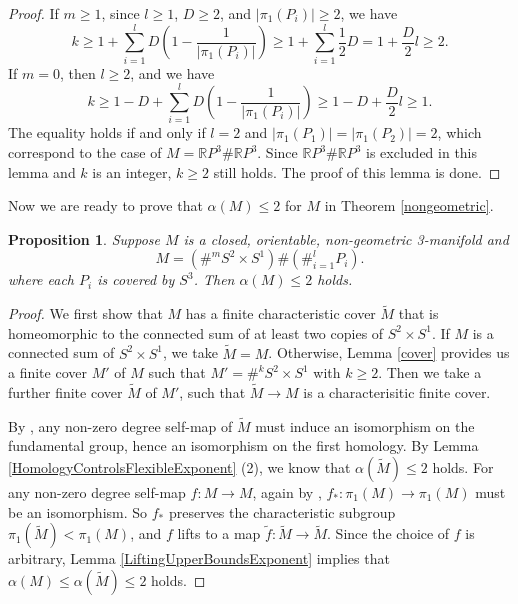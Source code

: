 \documentclass{amsart}
\newcommand{\ra}{\rightarrow}
\newtheorem{thm}{Theorem}[section]
\newtheorem{prop}[thm]{Proposition}
\begin{document}
\begin{proof}
If $m\geq 1$, since $l\geq 1$, $D\geq 2$, and $|\pi_1(P_i)|\geq 2$, we have 
$$k\geq 1+\sum_{i=1}^lD(1- \frac{1}{|\pi_1(P_i)|})\geq 1+\sum_{i=1}^l\frac{1}{2}D=1+\frac{D}{2}l\geq 2.$$ 
If $m=0$, then $l\geq 2$, and we have
$$k\geq 1-D+\sum_{i=1}^lD(1- \frac{1}{|\pi_1(P_i)|})\geq 1-D+\frac{D}{2}l\geq 1.$$
The equality holds if and only if $l=2$ and $|\pi_1(P_1)|=|\pi_1(P_2)|=2$, which correspond to the case of $M=\mathbb{R}P^3\# \mathbb{R}P^3$. Since $\mathbb{R}P^3\# \mathbb{R}P^3$ is excluded in this lemma and $k$ is an integer, $k\geq 2$ still holds. The proof of this lemma is done.

 \end{proof}


    
  
  Now we are ready to prove that $\alpha(M)\leq 2$ for $M$ in Theorem \ref{nongeometric}.
    
    \begin{prop}\label{upper bound}
    Suppose $M$ is a closed, orientable, non-geometric 3-manifold and  \[
        M=(\#^mS^2\times S^1)\#(\#_{i=1}^l P_i).
    \] where each $P_i$ is covered by $S^3$.
  Then $\alpha(M)\le 2$ holds.
    
    \end{prop}
\begin{proof} 
We first show that $M$ has a finite characteristic cover $\tilde{M}$ that is homeomorphic to the connected sum of at least two copies of $S^2\times S^1$. If $M$ is a connected sum of $S^2\times S^1$, we take $\tilde{M}=M$. Otherwise, Lemma \ref{cover} provides us a finite cover $M'$ of $M$ such that $M'=\#^k S^2\times S^1$ with $k\geq 2$. Then we take a further finite cover $\tilde{M}$ of $M'$, such that $\tilde{M}\to M$ is a characterisitic finite cover. 

    
    By \cite[Corollary 4.1]{Wang}, any non-zero degree self-map of $\tilde{M}$ must induce an isomorphism on the fundamental group, hence an isomorphism on the first homology. By Lemma \ref{HomologyControlsFlexibleExponent} (2), we know that $\alpha(\tilde{M})\le 2$ holds. 
For any non-zero degree self-map $f:M\ra M$, again by \cite[Corollary 4.1]{Wang}, $f_*:\pi_1(M)\ra \pi_1(M)$ must be an isomorphism. So $f_*$ preserves the characteristic subgroup  $\pi_1(\tilde{M})<\pi_1(M)$, and $f$ lifts to a map $\tilde{f}:\tilde{M}\ra \tilde{M}$. Since the choice of $f$ is arbitrary, Lemma \ref{LiftingUpperBoundsExponent} implies that $\alpha (M)\leq \alpha(\tilde{M})\le 2$ holds.
    \end{proof}
\end{document}
